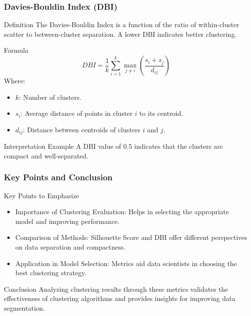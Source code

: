 \documentclass{beamer}
\begin{document}
\begin{frame}[fragile]
    \frametitle{Davies-Bouldin Index (DBI)}
    \begin{block}{Definition}
        The Davies-Bouldin Index is a function of the ratio of within-cluster scatter to between-cluster separation. A lower DBI indicates better clustering.
    \end{block}
    
    \begin{block}{Formula}
        \begin{equation}
        DBI = \frac{1}{k} \sum_{i=1}^{k} \max_{j \neq i} \left( \frac{s_i + s_j}{d_{ij}} \right)
        \end{equation}
        Where:
        \begin{itemize}
            \item \( k \): Number of clusters.
            \item \( s_i \): Average distance of points in cluster \( i \) to its centroid.
            \item \( d_{ij} \): Distance between centroids of clusters \( i \) and \( j \).
        \end{itemize}
    \end{block}
    
    \begin{block}{Interpretation Example}
        A DBI value of 0.5 indicates that the clusters are compact and well-separated.
    \end{block}
\end{frame}

\begin{frame}[fragile]
    \frametitle{Key Points and Conclusion}
    \begin{block}{Key Points to Emphasize}
        \begin{itemize}
            \item Importance of Clustering Evaluation: Helps in selecting the appropriate model and improving performance.
            \item Comparison of Methods: Silhouette Score and DBI offer different perspectives on data separation and compactness.
            \item Application in Model Selection: Metrics aid data scientists in choosing the best clustering strategy.
        \end{itemize}
    \end{block}
    
    \begin{block}{Conclusion}
        Analyzing clustering results through these metrics validates the effectiveness of clustering algorithms and provides insights for improving data segmentation.
    \end{block}
\end{frame}
\end{document}
